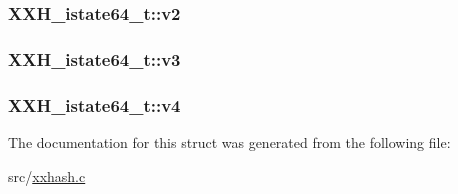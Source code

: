 \subsubsection[{v2}]{ X\+X\+H\+\_\+istate64\+\_\+t\+::v2}\label{struct_x_x_h__istate64__t_a8e14247869d90a1eea79cd99c0b06029}
\hypertarget{struct_x_x_h__istate64__t_a714d26f89359d5b897e3e8ffa97b946d}{}
\subsubsection[{v3}]{ X\+X\+H\+\_\+istate64\+\_\+t\+::v3}\label{struct_x_x_h__istate64__t_a714d26f89359d5b897e3e8ffa97b946d}
\hypertarget{struct_x_x_h__istate64__t_aeb3e5e9f7d5ce61021dca87fae23df27}{}
\subsubsection[{v4}]{ X\+X\+H\+\_\+istate64\+\_\+t\+::v4}\label{struct_x_x_h__istate64__t_aeb3e5e9f7d5ce61021dca87fae23df27}


The documentation for this struct was generated from the following file\+:\begin{DoxyCompactItemize}
\item 
src/\hyperlink{xxhash_8c}{xxhash.\+c}\end{DoxyCompactItemize}
